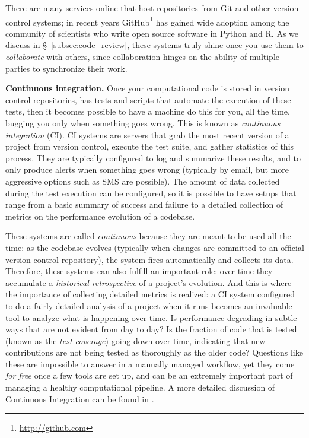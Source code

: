 \documentclass[11pt,oneside,english]{article}
\newcommand{\blockpar}[1]{\vspace*{3mm} \noindent \textbf{#1}}
\begin{document}
There are many services online that host repositories from Git and other
version control systems; in recent years
GitHub\footnote{\url{http://github.com}} has gained wide adoption among
the community of scientists who write open source software in Python and R.  As
we discuss in §~\ref{subsec:code_review}, these systems truly shine once you
use them to \emph{collaborate} with others, since collaboration hinges on the
ability of multiple parties to synchronize their work.

\blockpar{Continuous integration.} Once your computational code is stored in
version control repositories, has tests and scripts that automate the
execution of these tests, then it becomes possible to have a machine do
this for you, all the time, bugging you only when something goes wrong.  This
is known as \emph{continuous integration} (CI). CI
systems are servers that grab the most recent version of a project from version
control, execute the test suite, and gather statistics of this process.  They
are typically configured to log and summarize these results, and to only
produce alerts when something goes wrong (typically by email, but more
aggressive options such as SMS are possible).  The amount of data collected
during the test execution can be configured, so it is possible to have setups
that range from a basic summary of success and failure to a detailed collection
of metrics on the performance evolution of a codebase.

These systems are called \emph{continuous} because they are meant to be used
all the time: as the codebase evolves (typically when changes are committed to
an official version control repository), the system fires automatically and
collects its data.  Therefore, these systems can also fulfill an important
role: over time they accumulate a \emph{historical retrospective} of a
project's evolution.  And this is where the importance of collecting detailed
metrics is realized: a CI system configured to do a fairly detailed analysis of
a project when it runs becomes an invaluable tool to analyze what is happening
over time.  Is performance degrading in subtle ways that are not evident
from day to day? Is the fraction of code that is tested (known as the
\emph{test coverage}) going down over time, indicating that new contributions
are not being tested as thoroughly as the older code?  Questions like these are
impossible to answer in a manually managed workflow, yet they come \emph{for
free} once a few tools are set up, and can be an extremely important part of
managing a healthy computational pipeline.  A more detailed discussion of
Continuous Integration can be found in \cite{br-ck:2011}.
\end{document}
